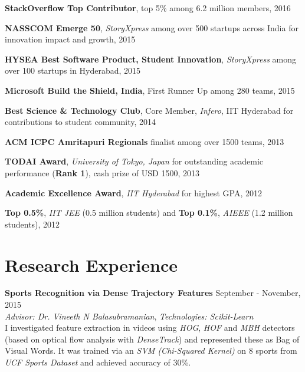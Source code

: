 \documentclass[margin,line]{res}
\begin{document}
\begin{resume}
  {\bf StackOverflow Top Contributor}, top 5\% among 6.2 million members, 2016

  \vspace*{-2.5mm}

  {\bf NASSCOM Emerge 50}, {\it StoryXpress} among over 500 startups across India for innovation impact and growth, 2015

  \vspace*{-2.5mm}

  {\bf HYSEA Best Software Product, Student Innovation}, {\it StoryXpress} among over 100 startups in Hyderabad, 2015

  \vspace*{-2.5mm}

  {\bf Microsoft Build the Shield, India}, First Runner Up among 280 teams, 2015

  \vspace*{-2.5mm}

  {\bf Best Science \& Technology Club}, Core Member, {\it Infero}, IIT Hyderabad for contributions to student community, 2014

  \vspace*{-2.5mm}

  {\bf ACM ICPC Amritapuri Regionals} finalist among over 1500 teams, 2013

  \vspace*{-2.5mm}

  {\bf TODAI Award}, {\it University of Tokyo, Japan} for outstanding academic performance ({\bf Rank 1}), cash prize of USD 1500, 2013

  \vspace*{-2.5mm}

  {\bf Academic Excellence Award}, {\it IIT Hyderabad} for highest GPA, 2012

  \vspace*{-2.5mm}

  {\bf Top 0.5\%}, {\it IIT JEE} (0.5 million students) and {\bf Top 0.1\%}, {\it AIEEE} (1.2 million students), 2012

\section{\sc Research Experience}

  {\bf Sports Recognition via Dense Trajectory Features} \hfill September - November, 2015 \\
  	{\em Advisor: Dr. Vineeth N Balasubramanian}, {\em Technologies: Scikit-Learn} \vspace{0.15 \baselineskip} \\
    I investigated feature extraction in videos using {\it HOG}, {\it HOF} and {\it MBH} detectors (based on optical flow analysis with {\it DenseTrack}) and represented these as Bag of Visual Words. It was trained via an {\it SVM (Chi-Squared Kernel)} on 8 sports from {\it UCF Sports Dataset} and achieved accuracy of 30\%.


\end{resume}
\end{document}
